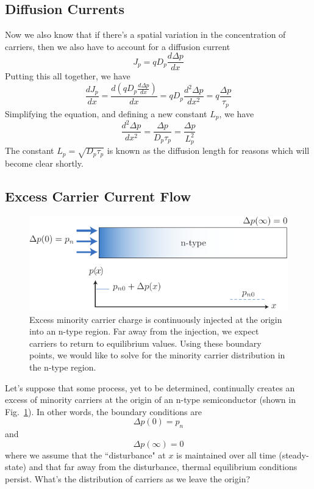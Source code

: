 \subsection{Diffusion Currents}

Now we also know that if there's a spatial variation in the concentration of carriers, then we also have to account for a diffusion current
%
\begin{equation}
	J_p = q D_p \frac{d\Delta p}{dx}
\end{equation}
%
Putting this all together, we have 
\begin{equation}
	\frac{dJ_p}{dx}  = \frac{d(q D_p \frac{d\Delta p}{dx})}{dx} = q D_p \frac{d^2 \Delta  p}{dx^2} = q \frac{\Delta p}{\tau_p}
\end{equation}
% 
Simplifying the equation, and defining a new constant $L_p$, we have
%
\begin{equation}
	 \frac{d^2 \Delta p}{dx^2} =  \frac{\Delta p}{D_p \tau_p} =  \frac{\Delta p}{L_p^2}
	 \label{eq:continuity}
\end{equation}
%
The constant $L_p = \sqrt{D_p \tau_p}$ is known as the diffusion length for reasons which will become clear shortly.
 
\subsection{Excess Carrier Current Flow}

\begin{figure}[tb]
\begin{center}
\includegraphics[width=.75\columnwidth]{excess_charge_inject}
\end{center}
\caption{Excess minority carrier charge is continuously injected at the origin into an n-type region.  Far away from the injection, we expect carriers to return to equilibrium values.  Using these boundary points, we would like to solve for the minority carrier distribution in the n-type region.} \label{fig:excess_charge_inject}
\end{figure}
 
Let's suppose that some process, yet to be determined, continually creates an excess of minority carriers at the origin of an n-type semiconductor (shown in Fig.~\ref{fig:excess_charge_inject}).  In other words, the boundary conditions are
%
\begin{equation}
	\Delta p(0) = p_{n}
\end{equation}	
and
\begin{equation}
	\Delta p(\infty) = 0
\end{equation}	
where we assume that the ``disturbance" at $x$ is maintained over all time (steady-state) and that far away from the disturbance, thermal equilibrium conditions persist.     What's the distribution of carriers as we leave the origin?  


